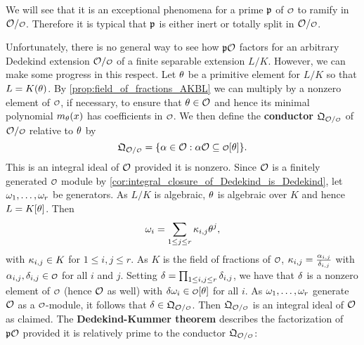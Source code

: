     \begin{remark}
      We will see that it is an exceptional phenomena for a prime $\mathfrak{p}$ of $\smc{O}$ to ramify in $\mc{O}/\smc{O}$. Therefore it is typical that $\mathfrak{p}$ is either inert or totally split in $\mc{O}/\smc{O}$.
    \end{remark}

    Unfortunately, there is no general way to see how $\mathfrak{p}\mathcal{O}$ factors for an arbitrary Dedekind extension $\mc{O}/\smc{O}$ of a finite separable extension $L/K$. However, we can make some progress in this respect. Let $\theta$ be a primitive element for $L/K$ so that $L = K(\theta)$. By \cref{prop:field_of_fractions_AKBL} we can multiply by a nonzero element of $\smc{O}$, if necessary, to ensure that $\theta \in \mathcal{O}$ and hence its minimal polynomial $m_{\theta}(x)$ has coefficients in $\smc{O}$. We then define the \textbf{conductor} $\mf{Q}_{\mc{O}/\smc{O}}$ of $\mc{O}/\smc{O}$ relative to $\theta$ by
    \[
      \mf{Q}_{\mc{O}/\smc{O}} = \{\a \in \mc{O}:\a\mc{O} \subseteq \smc{O}[\t]\}.
    \]
    This is an integral ideal of $\mathcal{O}$ provided it is nonzero. Since $\mathcal{O}$ is a finitely generated $\smc{O}$ module by \cref{cor:integral_closure_of_Dedekind_is_Dedekind}, let $\omega_{1},\ldots,\omega_{r}$ be generators. As $L/K$ is algebraic, $\theta$ is algebraic over $K$ and hence $L = K[\theta]$. Then
    \[
      \omega_{i} = \sum_{1 \le j \le r}\kappa_{i,j}\theta^{j},
    \]
    with $\kappa_{i,j} \in K$ for $1 \le i,j \le r$. As $K$ is the field of fractions of $\smc{O}$, $\kappa_{i,j} = \frac{\alpha_{i,j}}{\delta_{i,j}}$ with $\a_{i,j},\d_{i,j} \in \smc{O}$ for all $i$ and $j$. Setting $\delta = \prod_{1 \le i,j \le r}\delta_{i,j}$, we have that $\delta$ is a nonzero element of $\smc{O}$ (hence $\mathcal{O}$ as well) with $\d\w_{i} \in \smc{O}[\t]$ for all $i$. As $\omega_{1},\ldots,\omega_{r}$ generate $\mathcal{O}$ as a $\smc{O}$-module, it follows that $\d \in \mf{Q}_{\mc{O}/\smc{O}}$. Then $\mf{Q}_{\mc{O}/\smc{O}}$ is an integral ideal of $\mathcal{O}$ as claimed. The \textbf{Dedekind-Kummer theorem} describes the factorization of $\mathfrak{p}\mathcal{O}$ provided it is relatively prime to the conductor $\mf{Q}_{\mc{O}/\smc{O}}$:

